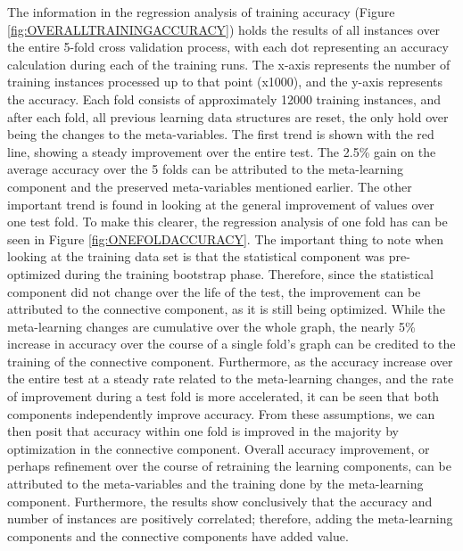 The information in the regression analysis of training
accuracy (Figure \ref{fig:OVERALLTRAININGACCURACY}) holds the results of all instances
over the entire 5-fold cross validation process, with each dot representing an accuracy
calculation during each of the training runs. The x-axis represents the 
number of training instances processed up to that point (x1000), and the y-axis 
represents the accuracy. Each fold consists of approximately 12000 training 
instances, and after each fold, all previous learning data structures are reset, 
the only hold over being the changes to the meta-variables. The first trend is shown 
with the red line, showing a steady improvement over the entire test. 
The 2.5\% gain on the average accuracy over the 5 folds can be attributed to the 
meta-learning component and the preserved meta-variables mentioned earlier. The 
other important trend is found in looking at the general
improvement of values over one test fold. To make this clearer, the regression
analysis of one fold has can be seen in Figure \ref{fig:ONEFOLDACCURACY}.  The important
thing to note when looking at the training data set is that the statistical component was
pre-optimized during the training bootstrap phase.  Therefore, since the
statistical component did not change over the life of the test, the improvement
can be attributed to the connective component, as it is still being optimized. 
While the meta-learning changes are cumulative over the whole graph, the nearly 
5\% increase in accuracy over the course of a single fold's graph can be credited 
to the training of the connective component. Furthermore, as the accuracy 
increase over the entire test at a steady rate related to the meta-learning changes, and the rate of
improvement during a test fold is more accelerated, it can be seen that both
components independently improve accuracy.  From these assumptions, we can then 
posit that accuracy within one fold is improved in the majority by 
optimization in the connective component.  Overall accuracy improvement, or 
perhaps refinement over the course of retraining the learning components, can be 
attributed to the meta-variables and the training done by the meta-learning 
component. Furthermore, the results show conclusively that the accuracy and 
number of instances are positively correlated; therefore, adding the meta-learning 
components and the connective components have added value.



